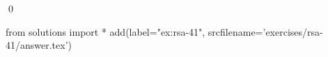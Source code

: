 
\begin{ex} 
  \label{ex:rsa-41}
  
  \qed
\end{ex} 
\begin{python0}
from solutions import *
add(label="ex:rsa-41",
    srcfilename='exercises/rsa-41/answer.tex') 
\end{python0}
